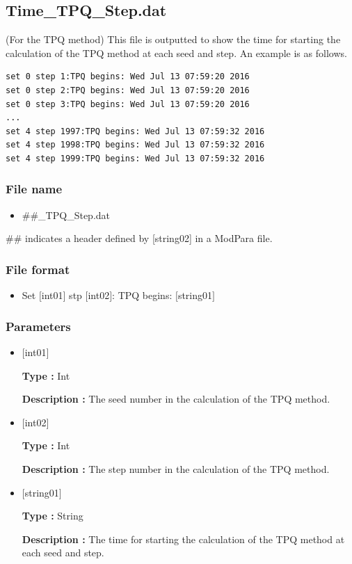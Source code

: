 \newpage
\subsection{Time\_TPQ\_Step.dat}
(For the TPQ method) This file is outputted to show the time for starting the calculation of the TPQ method at each seed and step. An example is as follows.\\
\begin{minipage}{15cm}
\begin{screen}
\begin{verbatim}
set 0 step 1:TPQ begins: Wed Jul 13 07:59:20 2016
set 0 step 2:TPQ begins: Wed Jul 13 07:59:20 2016
set 0 step 3:TPQ begins: Wed Jul 13 07:59:20 2016
...
set 4 step 1997:TPQ begins: Wed Jul 13 07:59:32 2016
set 4 step 1998:TPQ begins: Wed Jul 13 07:59:32 2016
set 4 step 1999:TPQ begins: Wed Jul 13 07:59:32 2016
\end{verbatim}
\end{screen}
\end{minipage}

\subsubsection{File name}
 \begin{itemize}
   \item  \#\#\_TPQ\_Step.dat
  \end{itemize}
  \#\# indicates a header defined by [string02] in a ModPara file.

\subsubsection{File format}
 \begin{itemize}
   \item Set $[$int01$]$ stp $[$int02$]$: TPQ begins: $[$string01$]$
  \end{itemize}
\subsubsection{Parameters}
 \begin{itemize}

  \item  $[$int01$]$
  
 {\bf Type :} Int

{\bf Description :} The seed number in the calculation of the TPQ method.
 
  \item  $[$int02$]$
  
 {\bf Type :} Int

{\bf Description :} The step number in the calculation of the TPQ method.

  \item  $[$string01$]$
  
 {\bf Type :} String

{\bf Description :} The time for starting the calculation of the TPQ method at each seed and step.

 \end{itemize}



